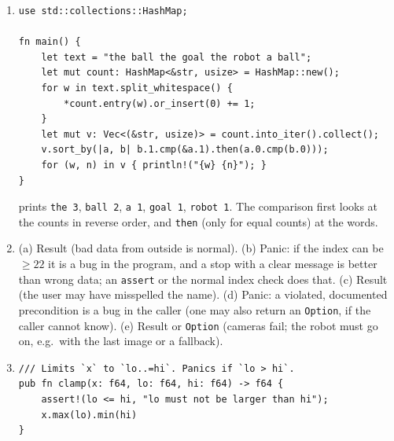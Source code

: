 \begin{enumerate}[label=\textbf{\ansnum.\arabic*}]
\begin{verbatim}
fn main() {
    println!("{:?}", moving_average(&[1.0, 2.0, 3.0, 4.0, 5.0], 3));
}
\end{verbatim}
The result is $[2,3,4]$ (three values: $5-3+1$). \verb!windows(0)! panics, so a robust version checks \verb!n > 0!.
  \item
\begin{verbatim}
use std::collections::HashMap;

fn main() {
    let text = "the ball the goal the robot a ball";
    let mut count: HashMap<&str, usize> = HashMap::new();
    for w in text.split_whitespace() {
        *count.entry(w).or_insert(0) += 1;
    }
    let mut v: Vec<(&str, usize)> = count.into_iter().collect();
    v.sort_by(|a, b| b.1.cmp(&a.1).then(a.0.cmp(b.0)));
    for (w, n) in v { println!("{w} {n}"); }
}
\end{verbatim}
prints \verb!the 3!, \verb!ball 2!, \verb!a 1!, \verb!goal 1!, \verb!robot 1!. The comparison first looks at the counts in reverse order, and \verb!then! (only for equal counts) at the words.
  \item (a) Result (bad data from outside is normal). (b) Panic: if the index can be $\ge22$ it is a bug in the program, and a stop with a clear message is better than wrong data; an \verb!assert! or the normal index check does that. (c) Result (the user may have misspelled the name). (d) Panic: a violated, documented precondition is a bug in the caller (one may also return an \verb!Option!, if the caller cannot know). (e) Result or \verb!Option! (cameras fail; the robot must go on, e.g.\ with the last image or a fallback).
  \item
\begin{verbatim}
/// Limits `x` to `lo..=hi`. Panics if `lo > hi`.
pub fn clamp(x: f64, lo: f64, hi: f64) -> f64 {
    assert!(lo <= hi, "lo must not be larger than hi");
    x.max(lo).min(hi)
}


\end{verbatim}
\end{enumerate}
